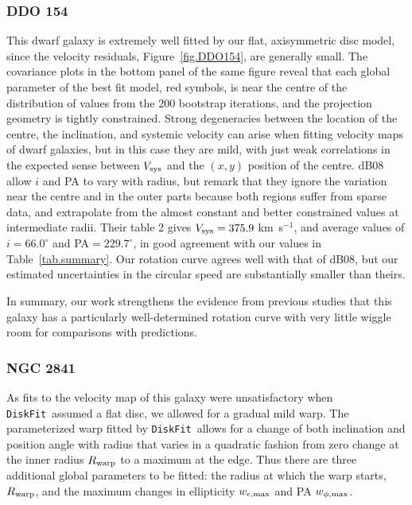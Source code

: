 \documentclass[letterpaper,fleqn,usenatbib]{mnras}
\def\DFt{{\tt DiskFit}}
\begin{document}
\subsubsection{DDO 154}
\label{sec.DDO154}
This dwarf galaxy is extremely well fitted by our flat, axisymmetric
disc model, since the velocity residuals, Figure~\ref{fig.DDO154}, are
generally small.  The covariance plots in the bottom panel of the same
figure reveal that each global parameter of the best fit model, red
symbols, is near the centre of the distribution of values from the 200
bootstrap iterations, and the projection geometry is tightly
constrained.  Strong degeneracies between the location of the centre,
the inclination, and systemic velocity can arise when fitting velocity
maps of dwarf galaxies, but in this case they are mild, with just weak
correlations in the expected sense between $V_{\rm sys}$ and the
$(x,y)$ position of the centre.  dB08 allow $i$ and PA to vary with
radius, but remark that they ignore the variation near the centre and
in the outer parts because both regions suffer from sparse data, and
extrapolate from the almost constant and better constrained values at
intermediate radii. Their table 2 gives $V_{\rm sys} =
375.9\;$km~s$^{-1}$, and average values of $i = 66.0^\circ$ and PA$=
229.7^\circ$, in good agreement with our values in
Table~\ref{tab.summary}.  Our rotation curve agrees well with that of
dB08, but our estimated uncertainties in the circular speed are
substantially smaller than theirs.

In summary, our work strengthens the evidence from previous studies
that this galaxy has a particularly well-determined rotation curve
with very little wiggle room for comparisons with predictions.

\subsubsection{NGC 2841}
\label{sec.N2841}
As fits to the velocity map of this galaxy were unsatisfactory when
\DFt\ assumed a flat disc, we allowed for a gradual mild warp.  The
parameterized warp fitted by \DFt\ allows for a change of both
inclination and position angle with radius that varies in a quadratic
fashion from zero change at the inner radius $R_{\rm warp}$ to a
maximum at the edge.  Thus there are three additional global
parameters to be fitted: the radius at which the warp starts, $R_{\rm
  warp}$, and the maximum changes in ellipticity $w_{\epsilon, \rm
  max}$ and PA $w_{\phi, \rm max}$.
\end{document}
